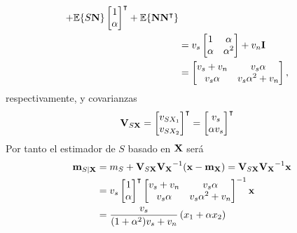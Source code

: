 \begin{solution}
\begin{parts}
\begin{align*}
	 + \mathbb{E}\{S {\bf N}\}  \begin{bmatrix} 1 \\ \alpha \end{bmatrix}^\intercal 
	 + \mathbb{E}\{{\bf N} {\bf N} ^\intercal \}  \\
	&= v_s \begin{bmatrix} 1 & \alpha \\ \alpha & \alpha^2 \end{bmatrix} + v_n {\bf I}  \\ 
	&= \begin{bmatrix} v_s + v_n & v_s \alpha \\ v_s \alpha & v_s \alpha^2 + v_n \end{bmatrix},
\end{align*}
respectivamente, y covarianzas
\begin{align*}
{\bf V}_{S{\bf X}}  
	&= \begin{bmatrix} v_{SX_1} \\ v_{SX_2} \end{bmatrix}^\intercal
	 = \begin{bmatrix} v_s \\ \alpha v_s \end{bmatrix}^\intercal
\end{align*}
Por tanto el estimador de $S$ basado en ${\bf X}$ será
\begin{align*}
{\bf m}_{S |{\bf X}} 
      &= m_S + {\bf V}_{S {\bf X}}{\bf V_X}^{-1}({\bf x}-{\bf m}_{\bf X})  
       = {\bf V}_{S {\bf X}}{\bf V_X}^{-1}{\bf x}  \\ 
      &= v_s \begin{bmatrix} 1 \\ \alpha \end{bmatrix}^\intercal  
         \begin{bmatrix} v_s + v_n & v_s \alpha \\ v_s \alpha & v_s \alpha^2 + v_n \end{bmatrix}^{-1}{\bf x}  \\ 
      &= \frac{v_s}{(1 + \alpha^2)v_s + v_n} \left( x_1 + \alpha x_2\right)
\end{align*}
\end{parts}
\end{solution}

\else

